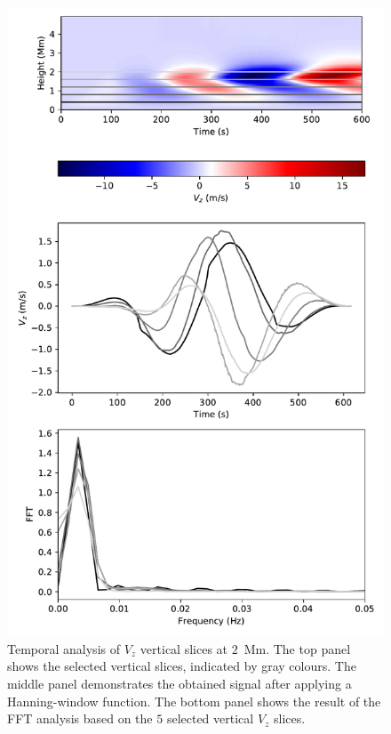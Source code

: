 \documentclass[physics,article,submit,pdftex,moreauthors]{Definitions/mdpi}
\begin{document}
\begin{figure}
    \centering
    \label{fft_sim2}
    \includegraphics[scale=0.55]{fft_sim2.pdf}
    \caption{Temporal analysis of $V_{z}$ vertical slices at $2$~Mm. The top panel shows the selected vertical slices, indicated by gray colours. The middle panel demonstrates the obtained signal after applying a Hanning-window function. The bottom panel shows the result of the FFT analysis based on the $5$ selected vertical $V_{z}$ slices.}

\end{figure}
\end{document}
